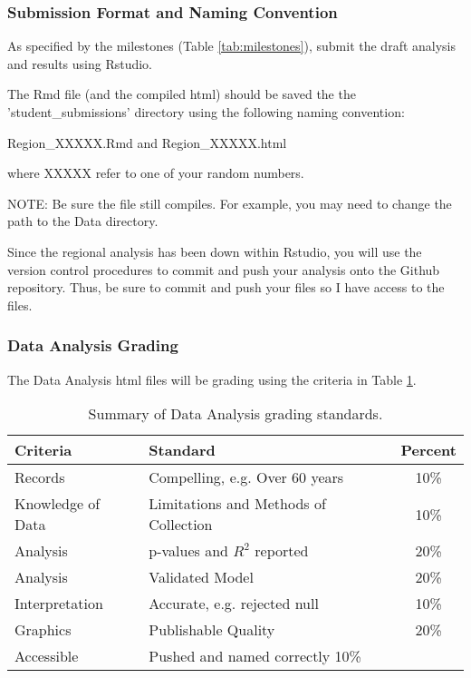 \subsubsection{Submission Format and Naming Convention}

As specified by the milestones (Table \ref{tab:milestones}), submit the draft analysis and results using Rstudio. 

The Rmd file (and the compiled html) should be saved the the 'student\_submissions' directory using the following naming convention:

Region\_XXXXX.Rmd and Region\_XXXXX.html


\medskip \noindent where XXXXX refer to one of your random numbers.

NOTE: Be sure the file still compiles. For example, you may need to change the path to the Data directory. 

Since the regional analysis has been down within Rstudio, you will use the version control procedures to commit and push your analysis onto the Github repository. Thus, be sure to commit and push your files so I have access to the files. 

\subsubsection{Data Analysis Grading}

The Data Analysis html files will be grading using the criteria in Table \ref{tab:datagrading}.

\begin{table}[h]
\caption{Summary of Data Analysis grading standards.}
\label{tab:datagrading}
\begin{tabular}{llc}\hline
Criteria            &   Standard    & Percent \\ \hline\hline
Records  & Compelling, e.g. Over 60 years & 10\% \\
Knowledge of Data & Limitations and Methods of Collection & 10\% \\
Analysis & p-values and $R^2$ reported  & 20\% \\
Analysis          & Validated Model     & 20\% \\
Interpretation    & Accurate, e.g. rejected null   & 10\% \\
Graphics          & Publishable Quality & 20\% \\
Accessible        & Pushed and named correctly  10\% \\
\hline
\end{tabular}
\end{table}